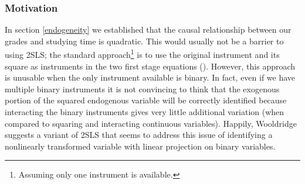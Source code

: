 \documentclass[12pt]{article}
\begin{document}
\subsubsection{Motivation}
In section \ref{endogeneity} we established that the causal relationship between our grades and studying time is quadratic. This would usually not be a barrier to using 2SLS; the standard approach\footnote{Assuming only one instrument is available.} is to use the original instrument and its square as instruments in the two first stage equations (\cite{harmless}). However, this approach is unusable when the only instrument available is binary. In fact, even if we have multiple binary instruments it is not convincing to think that the exogenous portion of the squared endogenous variable will be correctly identified because interacting the binary instruments gives very little additional variation (when compared to squaring and interacting continuous variables). Happily, Wooldridge suggests a variant of 2SLS that seems to address this issue of identifying a nonlinearly transformed variable with linear projection on binary variables.

\end{document}
